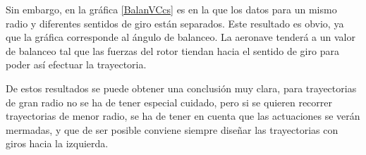 Sin embargo, en la gráfica \ref{BalanVCcs} es en la que los datos para un mismo radio y diferentes sentidos de giro están separados. Este resultado es obvio, ya que la gráfica corresponde al ángulo de balanceo. La aeronave tenderá a un valor de balanceo tal que las fuerzas del rotor tiendan hacia el sentido de giro para poder así efectuar la trayectoria.

De estos resultados se puede obtener una conclusión muy clara, para trayectorias de gran radio no se ha de tener especial cuidado, pero si se quieren recorrer trayectorias de menor radio, se ha de tener en cuenta que las actuaciones se verán mermadas, y que de ser posible conviene siempre diseñar las trayectorias con giros hacia la izquierda.

%
%
